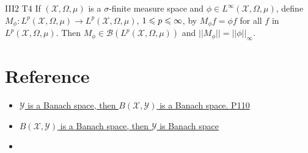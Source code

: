 \begin{exercise}{III2 T4}{}
    If $(\mathscr{X},\Omega,\mu)$ is a $\sigma$-finite measure space and $\phi\in L^{\infty}(\mathscr{X},\Omega,\mu)$,
    define $M_{\phi}:L^p(\mathscr{X},\Omega,\mu)\rightarrow L^p(\mathscr{X},\Omega,\mu)$, $1\leqslant p\leqslant \infty$, 
    by $M_{\phi}f=\phi f$ for all $f$ in $L^p(\mathscr{X},\Omega,\mu)$.
    Then $M_{\phi}\in\mathscr{B}(L^p(\mathscr{X},\Omega,\mu))$ and $||M_{\phi}||=||\phi||_{\infty}$.

\end{exercise}

\section{Reference}

\begin{itemize}
    \item \href{https://www.math.ucdavis.edu/~hunter/book/ch5.pdf}{$\mathscr{Y}$ is a Banach space, then
    $B(\mathscr{X}, \mathscr{Y})$ is a Banach space. P110}
    \item \href{https://math.stackexchange.com/questions/4759249/let-mathcalb-0x-Y-is-a-banach-space-does-this-imply-that-Y-is-a-banac?noredirect=1&lq=1}{$B(\mathscr{X}, \mathscr{Y})$ is a Banach space, then $\mathscr{Y}$ is Banach space}
    \item \href{https://www.ucl.ac.uk/~ucahad0/3103_handout_6.pdf}{}
\end{itemize}
